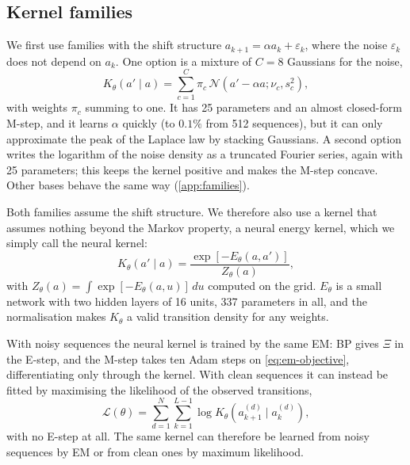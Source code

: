 \subsection{Kernel families}
\label{sec:kernel-families}

We first use families with the shift structure $a_{k+1}=\alpha a_k+\varepsilon_k$, where the noise $\varepsilon_k$ does
not depend on $a_k$. One option is a mixture of $C=8$ Gaussians for the noise,
\begin{equation}
    K_\theta(a'\mid a)
    =
    \sum_{c=1}^{C}
    \pi_c\,
    \mathcal{N}
    \left(
        a'-\alpha a;\nu_c,s_c^2
    \right),
\end{equation}
with weights $\pi_c$ summing to one. It has 25 parameters and an almost closed-form M-step, and it learns $\alpha$
quickly (to $0.1\%$ from 512 sequences), but it can only approximate the peak of the Laplace law by stacking Gaussians.
A second option writes the logarithm of the noise density as a truncated Fourier series, again with 25 parameters; this
keeps the kernel positive and makes the M-step concave. Other bases behave the same way (\cref{app:families}).

Both families assume the shift structure. We therefore also use a kernel that assumes nothing beyond the Markov
property, a neural energy kernel, which we simply call the neural kernel:
\begin{equation}
    K_\theta(a'\mid a)
    =
    \frac{
        \exp[-E_\theta(a,a')]
    }{
        Z_\theta(a)
    },
    \label{eq:neural-kernel}
\end{equation}
with $Z_\theta(a)=\int\exp[-E_\theta(a,u)]\,du$ computed on the grid. $E_\theta$ is a small network with two hidden
layers of 16 units, 337 parameters in all, and the normalisation makes $K_\theta$ a valid transition density for any
weights.

With noisy sequences the neural kernel is trained by the same EM: BP gives $\Xi$ in the E-step, and the M-step takes
ten Adam steps \cite{kingma2015adam} on \cref{eq:em-objective}, differentiating only through the kernel. With clean
sequences it can instead be fitted by maximising the likelihood of the observed transitions,
\begin{equation}
    \mathcal{L}(\theta)
    =
    \sum_{d=1}^{N}
    \sum_{k=1}^{L-1}
    \log K_\theta
    \left(
        a_{k+1}^{(d)}
        \mid a_k^{(d)}
    \right),
    \label{eq:neural-clean-ml}
\end{equation}
with no E-step at all. The same kernel can therefore be learned from noisy sequences by EM or from clean ones by
maximum likelihood.

